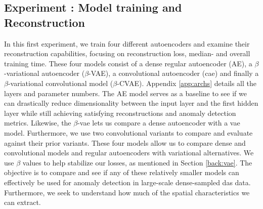 \subsection{Experiment : Model training and Reconstruction}
In this first experiment, we train four different autoencoders and examine their reconstruction capabilities, focusing on reconstruction loss, median- and overall training time. These four models consist of a dense regular autoencoder (AE), a $\beta$-variational autoencoder ($\beta$-VAE), a convolutional autoencoder (\acrshort{cae}) and finally a $\beta$-variational convolutional model ($\beta$-CVAE). Appendix \ref{app:archs} details all the layers and parameter numbers. The AE model serves as a baseline to see if we can drastically reduce dimensionality between the input layer and the first hidden layer while still achieving satisfying reconstructions and anomaly detection metrics. Likewise, the $\beta$-\acrshort{vae} lets us compare a dense autoencoder with a \acrshort{vae} model.
Furthermore, we use two convolutional variants to compare and evaluate against their prior variants. These four models allow us to compare dense and convolutional models and regular autoencoders with variational alternatives. We use $\beta$ values to help stabilize our losses, as mentioned in Section \ref{back:vae}. The objective is to compare and see if any of these relatively smaller models can effectively be used for anomaly detection in large-scale dense-sampled \acrshort{das} data. Furthermore, we seek to understand how much of the spatial characteristics we can extract.

